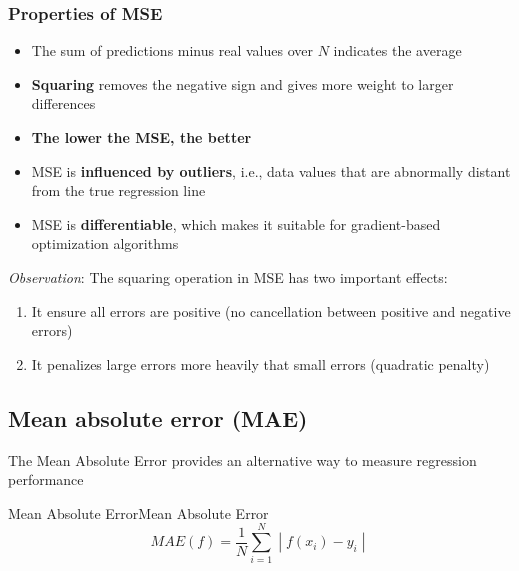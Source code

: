 \documentclass[a4paper]{article}
\theoremstyle{definition}
\begin{document}
\subsubsection{Properties of MSE}
\begin{itemize}
    \item The sum of predictions minus real values over \( N \) indicates the average 
    \item \textbf{Squaring} removes the negative sign and gives more weight to larger differences 
    \item \textbf{The lower the MSE, the better}
    \item MSE is \textbf{influenced by outliers}, i.e., data values that are abnormally distant from the true regression line 
    \item MSE is \textbf{differentiable}, which makes it suitable for gradient-based optimization algorithms
\end{itemize}
\textit{Observation}: The squaring operation in MSE has two important effects:
\begin{enumerate}
    \item It ensure all errors are positive (no cancellation between positive and negative errors)
    \item It penalizes large errors more heavily that small errors (quadratic penalty)
\end{enumerate}
\subsection{Mean absolute error (MAE)}
The Mean Absolute Error provides an alternative way to measure regression performance
\begin{definition}{Mean Absolute Error}{Mean Absolute Error}
\[
  MAE(f) = \frac{1}{N} \sum_{i = 1}^{N} \;|\; f(x_i) - y_i \;|\; 
\]
\end{definition}
\end{document}
